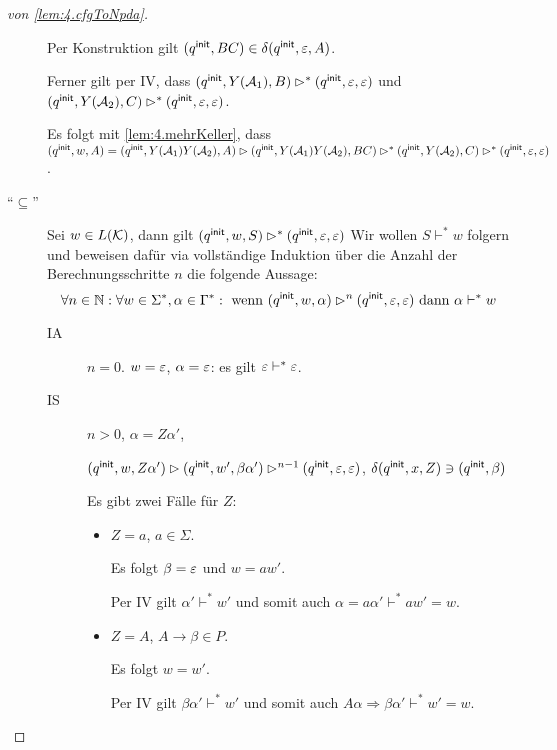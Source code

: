 \begin{proof}[von \autoref{lem:4.cfgToNpda}]
\begin{description}
        Per Konstruktion gilt $(q^\mathsf{init}, BC) \in \delta(q^\mathsf{init}, \varepsilon, A)$. 

        Ferner gilt per IV, dass $(q^\mathsf{init}, Y(\mathcal{A}_1), B) \rhd^* (q^\mathsf{init}, \varepsilon, \varepsilon)$ und $(q^\mathsf{init}, Y(\mathcal{A}_2), C) \rhd^* (q^\mathsf{init}, \varepsilon, \varepsilon)$.

        Es folgt mit \autoref{lem:4.mehrKeller}, dass $(q^\mathsf{init}, w, A) = (q^\mathsf{init}, Y(\mathcal{A}_1)Y(\mathcal{A}_2), A)\rhd (q^\mathsf{init}, Y(\mathcal{A}_1)Y(\mathcal{A}_2), BC) \rhd^* (q^\mathsf{init}, Y(\mathcal{A}_2), C) \rhd^* (q^\mathsf{init}, \varepsilon, \varepsilon)$.
 \item[``$\subseteq$'']
 Sei $w\in L(\mathcal{K})$, dann gilt $(q^\mathsf{init}, w, S) \rhd^* (q^\mathsf{init}, \varepsilon, \varepsilon)$
 Wir wollen $S \vdash^* w$ folgern und beweisen dafür via vollständige Induktion über die Anzahl der Berechnungsschritte $n$ die folgende Aussage:
     \begin{displaymath}
      \forall n \in \mathbb{N}: \forall w \in \Sigma^*, \alpha \in \Gamma^*: \text{ wenn } (q^\mathsf{init}, w, \alpha) \rhd^n (q^\mathsf{init}, \varepsilon, \varepsilon) \text{ dann } \alpha \vdash^* w 
    \end{displaymath}
    
    \begin{description}
    \item[IA] $n = 0$.
      $w = \varepsilon$, $\alpha = \varepsilon$: es gilt $\varepsilon \vdash^* \varepsilon$.

  \item[IS] $n > 0$, $\alpha = Z\alpha'$,

    $(q^\mathsf{init},w,Z\alpha') \rhd (q^\mathsf{init}, w', \beta\alpha') \rhd^{n-1} (q^\mathsf{init}, \varepsilon, \varepsilon)$, $\delta(q^\mathsf{init}, x, Z) \ni (q^\mathsf{init}, \beta)$

    Es gibt zwei Fälle für $Z$:
    \begin{itemize}
    \item $Z = a$, $a \in \Sigma$.

      Es folgt $\beta = \varepsilon$ und $w = aw'$.

      Per IV gilt $\alpha' \vdash^* w'$ und somit auch $\alpha = a\alpha' \vdash^*aw' = w$.
    \item $Z = A$, $A \to \beta \in P$.

      Es folgt $w = w'$.

      Per IV gilt $\beta\alpha' \vdash^* w'$ und somit auch $A\alpha \Longrightarrow \beta\alpha' \vdash^* w' = w$.
    \end{itemize}
    \end{description}
 
\end{description}

\end{proof}


